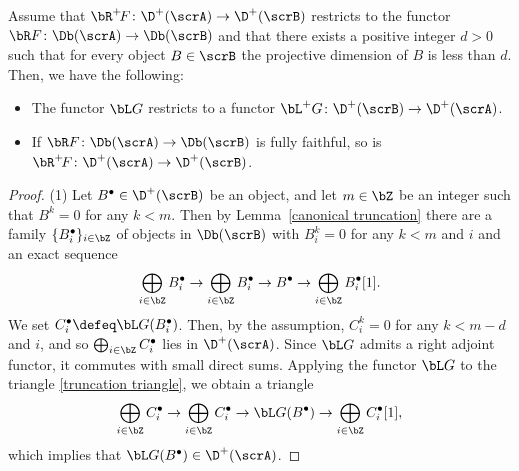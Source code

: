 \begin{lem}\label{above ff}
 Assume that $\bR^+\!F\colon \D^+(\scrA)\to \D^+(\scrB)$ restricts to the functor $\bR F\colon \Db(\scrA)\to\Db(\scrB)$ and that there exists a positive integer $d>0$ such that for every object $B\in \scrB$ the projective dimension of $B$ is less than $d$.
 Then, we have the following:
 \begin{itemize}\itemsep=0pt
 \item[$1.$] The functor $\bL G$ restricts to a functor $\bL^{+}G\colon \D^+(\scrB)\to \D^+(\scrA)$.
 \item[$2.$] If $\bR F\colon \Db(\scrA)\to\Db(\scrB)$ is fully faithful, so is $\bR^+\!F\colon \D^+(\scrA)\to \D^+(\scrB)$.
 \end{itemize}
\begin{proof}
(1)
Let $B^{\bullet}\in \D^+(\scrB)$ be an object, and let $m\in\bZ$ be an integer such that $B^k=0$ for any $k<m$. Then by Lemma~\ref{canonical truncation} there are a family $\{B^{\bullet}_i\}_{i\in\bZ}$ of objects in $\Db(\scrB)$ with $B_i^k=0$ for any $k<m$ and $i$ and an exact sequence
\begin{equation}\label{truncation triangle}
\bigoplus_{i\in \bZ}B^{\bullet}_i\to \bigoplus_{i\in \bZ}B^{\bullet}_i\to B^{\bullet}\to \bigoplus_{i\in \bZ}B^{\bullet}_i[1].
\end{equation}
We set $C_i^{\bullet}\defeq\bL G(B^{\bullet}_i)$. Then, by the assumption, $C_i^{k}=0$ for any $k<m-d$ and $i$, and so $\bigoplus_{i\in \bZ}C_i^{\bullet}$ lies in $\D^+(\scrA)$.
Since $\bL G$ admits a right adjoint functor, it commutes with small direct sums.
Applying the functor $\bL G$ to the triangle \eqref{truncation triangle}, we obtain a triangle
\begin{gather*}
\bigoplus_{i\in \bZ}C^{\bullet}_i\to \bigoplus_{i\in \bZ}C^{\bullet}_i\to \bL G(B^{\bullet})\to \bigoplus_{i\in \bZ}C^{\bullet}_i[1],
\end{gather*}
which implies that $\bL G(B^{\bullet})\in\D^+(\scrA)$.



\end{proof}
\end{lem}
